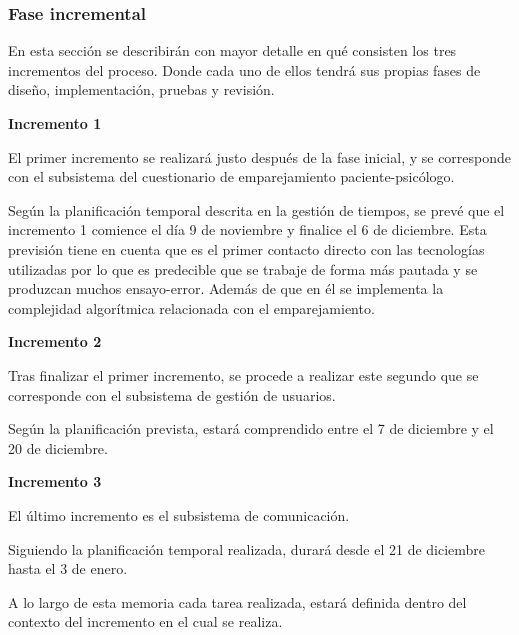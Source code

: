 \subsubsection{Fase incremental}
En esta sección se describirán con mayor detalle en qué consisten los tres incrementos del proceso. Donde cada uno de ellos tendrá sus propias fases de diseño, implementación, pruebas y revisión. \newline

\textbf{Incremento 1}\newline


El primer incremento se realizará justo después de la fase inicial, y se corresponde con el subsistema del cuestionario de emparejamiento paciente-psicólogo.


Según la planificación temporal descrita en la gestión de tiempos, se prevé que el incremento 1 comience el día 9 de noviembre y finalice el 6 de diciembre. Esta previsión tiene en cuenta que es el primer contacto directo con las tecnologías utilizadas por lo que es predecible que se trabaje de forma más pautada y se produzcan muchos ensayo-error. Además de que en él se implementa la complejidad algorítmica relacionada con el emparejamiento.\newline


\textbf{Incremento 2}\newline


Tras finalizar el primer incremento, se procede a realizar este segundo que se corresponde con el subsistema de gestión de usuarios.


Según la planificación prevista, estará comprendido entre el 7 de diciembre y el 20 de diciembre.\newline


\textbf{Incremento 3}\newline


El último incremento es el subsistema de comunicación. 


Siguiendo la planificación temporal realizada, durará desde el 21 de diciembre hasta el 3 de enero.


A lo largo de esta memoria cada tarea realizada, estará definida dentro del contexto del incremento en el cual se realiza.


